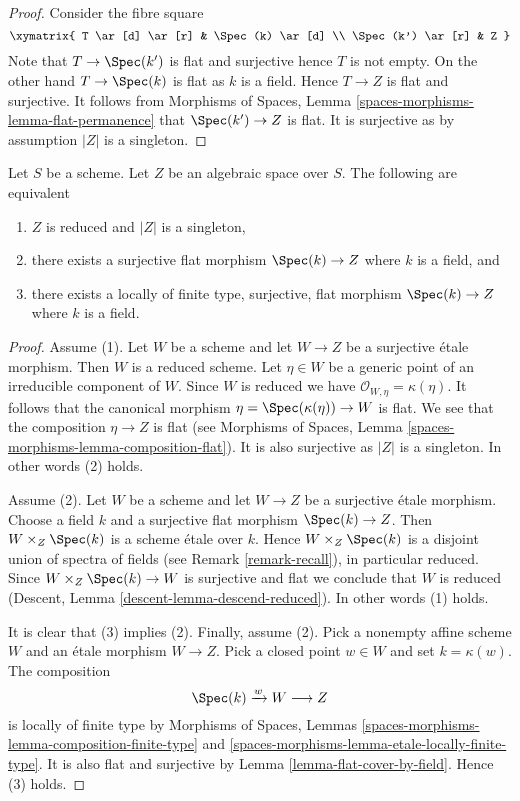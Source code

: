 \begin{proof}
Consider the fibre square
$$
\xymatrix{
T \ar[d] \ar[r] & \Spec(k) \ar[d] \\
\Spec(k') \ar[r] & Z
}
$$
Note that $T \to \Spec(k')$ is flat and surjective hence $T$
is not empty. On the other hand $T \to \Spec(k)$ is flat as
$k$ is a field. Hence $T \to Z$ is flat and surjective.
It follows from
Morphisms of Spaces, Lemma \ref{spaces-morphisms-lemma-flat-permanence}
that $\Spec(k') \to Z$ is flat. It is surjective as by assumption
$|Z|$ is a singleton.
\end{proof}

\begin{lemma}
\label{lemma-unique-point}
Let $S$ be a scheme.
Let $Z$ be an algebraic space over $S$. The following are equivalent
\begin{enumerate}
\item $Z$ is reduced and $|Z|$ is a singleton,
\item there exists a surjective flat morphism $\Spec(k) \to Z$
where $k$ is a field, and
\item there exists a locally of finite type, surjective, flat morphism
$\Spec(k) \to Z$ where $k$ is a field.
\end{enumerate}
\end{lemma}

\begin{proof}
Assume (1). Let $W$ be a scheme and
let $W \to Z$ be a surjective \'etale morphism. Then $W$ is
a reduced scheme. Let $\eta \in W$ be a generic point of an irreducible
component of $W$. Since $W$ is reduced we have
$\mathcal{O}_{W, \eta} = \kappa(\eta)$. It follows that the canonical
morphism $\eta = \Spec(\kappa(\eta)) \to W$ is flat. We see that the
composition $\eta \to Z$ is flat (see
Morphisms of Spaces, Lemma \ref{spaces-morphisms-lemma-composition-flat}).
It is also surjective as $|Z|$ is a singleton. In other words
(2) holds.

\medskip\noindent
Assume (2). Let $W$ be a scheme and
let $W \to Z$ be a surjective \'etale morphism. Choose a field
$k$ and a surjective flat morphism $\Spec(k) \to Z$.
Then $W \times_Z \Spec(k)$ is a scheme \'etale over $k$.
Hence $W \times_Z \Spec(k)$ is a disjoint union of spectra of fields
(see Remark \ref{remark-recall}), in particular reduced. Since
$W \times_Z \Spec(k) \to W$
is surjective and flat we conclude that $W$ is reduced
(Descent, Lemma \ref{descent-lemma-descend-reduced}).
In other words (1) holds.

\medskip\noindent
It is clear that (3) implies (2). Finally, assume (2). Pick a nonempty
affine scheme $W$ and an \'etale morphism $W \to Z$. Pick a closed
point $w \in W$ and set $k = \kappa(w)$. The composition
$$
\Spec(k) \xrightarrow{w} W \longrightarrow Z
$$
is locally of finite type by
Morphisms of Spaces, Lemmas
\ref{spaces-morphisms-lemma-composition-finite-type} and
\ref{spaces-morphisms-lemma-etale-locally-finite-type}.
It is also flat and surjective by
Lemma \ref{lemma-flat-cover-by-field}.
Hence (3) holds.
\end{proof}

